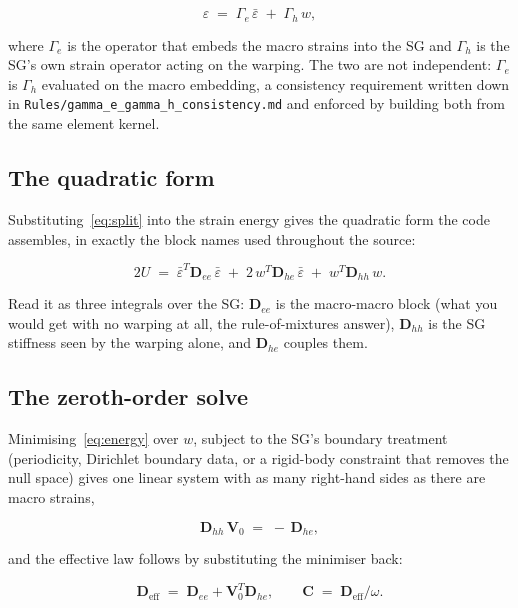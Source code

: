 \begin{equation}
\varepsilon \;=\; \Gamma_e\,\bar\varepsilon \;+\; \Gamma_h\,w ,
\label{eq:split}
\end{equation}

where $\Gamma_e$ is the operator that embeds the macro strains into the SG and
$\Gamma_h$ is the SG's own strain operator acting on the warping. The two are
not independent: $\Gamma_e$ is $\Gamma_h$ evaluated on the macro embedding, a
consistency requirement written down in
\texttt{Rules/gamma\_e\_gamma\_h\_consistency.md} and enforced by building both
from the same element kernel.

\subsection{The quadratic form}

Substituting~\eqref{eq:split} into the strain energy gives the quadratic form
the code assembles, in exactly the block names used throughout the source:

\begin{equation}
2U \;=\; \bar\varepsilon^{T}\mathbf{D}_{ee}\,\bar\varepsilon
      \;+\; 2\,w^{T}\mathbf{D}_{he}\,\bar\varepsilon
      \;+\; w^{T}\mathbf{D}_{hh}\,w .
\label{eq:energy}
\end{equation}

Read it as three integrals over the SG: $\mathbf{D}_{ee}$ is the macro-macro
block (what you would get with no warping at all, the rule-of-mixtures answer),
$\mathbf{D}_{hh}$ is the SG stiffness seen by the warping alone, and
$\mathbf{D}_{he}$ couples them.

\subsection{The zeroth-order solve}

Minimising~\eqref{eq:energy} over $w$, subject to the SG's boundary treatment
(periodicity, Dirichlet boundary data, or a rigid-body constraint that removes
the null space) gives one linear system with as many right-hand sides as there
are macro strains,

\begin{equation}
\mathbf{D}_{hh}\,\mathbf{V}_0 \;=\; -\,\mathbf{D}_{he},
\label{eq:v0}
\end{equation}

and the effective law follows by substituting the minimiser back:

\begin{equation}
\mathbf{D}_{\mathrm{eff}} \;=\; \mathbf{D}_{ee} + \mathbf{V}_0^{T}\mathbf{D}_{he},
\qquad
\mathbf{C} \;=\; \mathbf{D}_{\mathrm{eff}}/\omega .
\label{eq:deff}
\end{equation}

